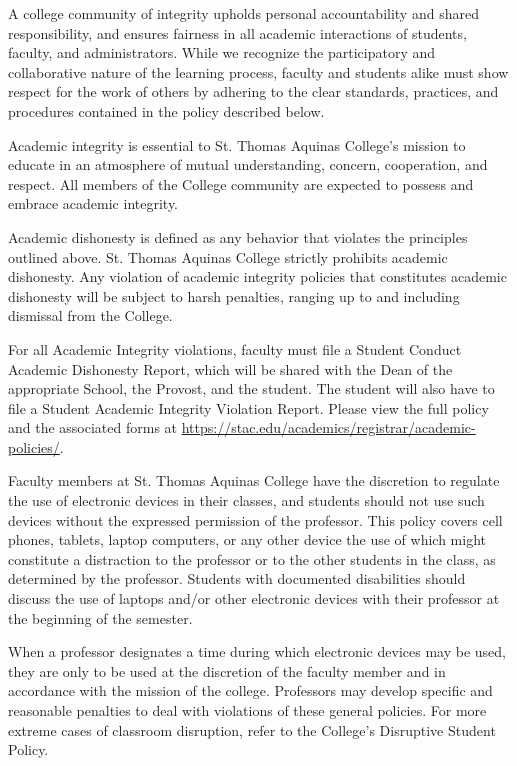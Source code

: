 \documentclass[11pt,letterpaper]{article}
\begin{document}
A college community of integrity upholds personal accountability and shared responsibility, and ensures fairness in all academic interactions of students, faculty, and administrators. While we recognize the participatory and collaborative nature of the learning process, faculty and students alike must show respect for the work of others by adhering to the clear standards, practices, and procedures contained in the policy described below. \pspace

Academic integrity is essential to St. Thomas Aquinas College’s mission to educate in an atmosphere of mutual understanding, concern, cooperation, and respect. All members of the College community are expected to possess and embrace academic integrity. \sectionbreak




Academic dishonesty is defined as any behavior that violates the principles outlined above. St. Thomas Aquinas College strictly prohibits academic dishonesty. Any violation of academic integrity policies that constitutes academic dishonesty will be subject to harsh penalties, ranging up to and including dismissal from the College. \pspace

For all Academic Integrity violations, faculty must file a Student Conduct Academic Dishonesty Report, which will be shared with the Dean of the appropriate School, the Provost, and the student. The student will also have to file a Student Academic Integrity Violation Report. Please view the full policy and the associated forms at \url{https://stac.edu/academics/registrar/academic-policies/}. \sectionbreak




Faculty members at St. Thomas Aquinas College have the discretion to regulate the use of electronic devices in their classes, and students should not use such devices without the expressed permission of the professor. This policy covers cell phones, tablets, laptop computers, or any other device the use of which might constitute a distraction to the professor or to the other students in the class, as determined by the professor. Students with documented disabilities should discuss the use of laptops and/or other electronic devices with their professor at the beginning of the semester. \pspace

When a professor designates a time during which electronic devices may be used, they are only to be used at the discretion of the faculty member and in accordance with the mission of the college. Professors may develop specific and reasonable penalties to deal with violations of these general policies. For more extreme cases of classroom disruption, refer to the College's Disruptive Student Policy. \pspace
\end{document}
